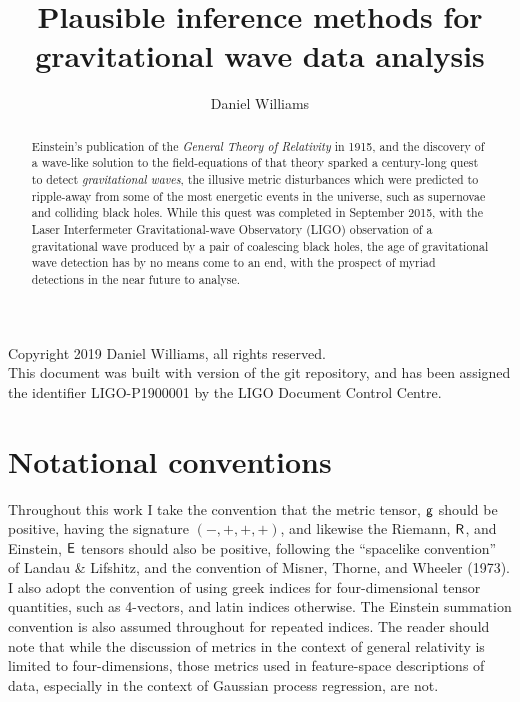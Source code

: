 \documentclass{kentigern}
\title{Plausible inference methods for gravitational wave data analysis}
\author{Daniel Williams}
\theoremstyle{definition}
\begin{document}
\openleft
\frontmatter
\thesistitle

\begin{abstract}
  Einstein's publication of the \textit{General Theory of Relativity} in 1915, and the discovery of a wave-like solution to the field-equations of that theory sparked a century-long quest to detect \textit{gravitational waves},
  the illusive metric disturbances which were predicted to ripple-away from some of the most energetic events in the universe, such as supernovae and colliding black holes.
  While this quest was completed in September 2015, with the Laser Interfermeter Gravitational-wave Observatory (LIGO) observation of a gravitational wave produced by a pair of coalescing black holes,
  the age of gravitational wave detection has by no means come to an end,
  with the prospect of myriad detections in the near future to analyse.
\end{abstract}
\newpage

Copyright 2019 Daniel Williams, all rights reserved.\\

This document was built with version  of the git repository, and has been assigned the identifier LIGO-P1900001 by the LIGO Document Control Centre.

\newpage
\tableofcontents
\newpage
\listoffigures
\newpage
\listoftables
\newpage

\printglossary[type=\acronymtype]



\section{Notational conventions}
\label{sec:notation-conventions}

Throughout this work I take the convention that the metric tensor, $\mathsf{g}$ should be positive, having the signature $(-,+,+,+)$, and likewise the Riemann, $\mathsf{R}$, and Einstein, $\mathsf{E}$ tensors should also be positive, following the ``spacelike convention'' of Landau \& Lifshitz, and the convention of Misner, Thorne, and Wheeler (1973). I also adopt the convention of using greek indices for four-dimensional tensor quantities, such as 4-vectors, and latin indices otherwise. The Einstein summation convention is also assumed throughout for repeated indices. The reader should note that while the discussion of metrics in the context of general relativity is limited to four-dimensions, those metrics used in feature-space descriptions of data, especially in the context of Gaussian process regression, are not. 
\end{document}
